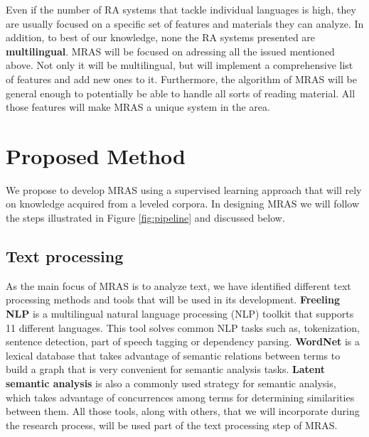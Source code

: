 \documentclass[12pt]{article}
\begin{document}
Even if the number of RA systems that tackle individual languages is high, they are usually focused on a specific set of features and materials they can analyze. In addition, to best of our knowledge, none the RA systems presented are \textbf{multilingual}. MRAS will be focused on adressing all the issued mentioned above. Not only it will be multilingual, but will implement a comprehensive list of features and add new ones to it. Furthermore, the algorithm of MRAS will be general enough to potentially be able to handle all sorts of reading material. All those features will make MRAS a unique system in the area.




\section{Proposed Method}

We propose to develop MRAS using a supervised learning approach that will rely on knowledge acquired from a leveled corpora. In designing MRAS we will follow the steps illustrated in Figure \ref{fig:pipeline} and discussed below.


\subsection{Text processing}
As the main focus of MRAS is to analyze text, we have identified different text processing methods and tools that will be used in its development. \textbf{Freeling NLP} \cite{padro12,padro10b} is a multilingual natural language processing (NLP) toolkit that supports 11 different languages. This tool solves common NLP tasks such as, tokenization, sentence detection, part of speech tagging or dependency parsing. \textbf{WordNet} is a lexical database that takes advantage of semantic relations between terms to build a graph that is very convenient for semantic analysis tasks. \textbf{Latent semantic analysis} is also a commonly used strategy  for semantic analysis, which takes advantage of concurrences among terms for determining similarities between them. All those tools, along with others, that we will incorporate during the research process, will be used part of the text processing step of MRAS.
\end{document}
